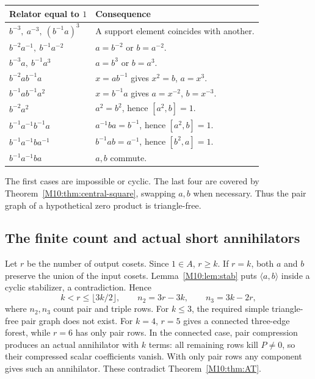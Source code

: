 \documentclass[11pt,a4paper,oneside]{report}
\theoremstyle{definition}
\theoremstyle{remark}
\begin{document}
\begin{center}\small
\begin{tabular}{@{}ll@{}}
\toprule
Relator equal to $1$ & Consequence \\
\midrule
$b^{-3},\ a^{-3},\ (b^{-1}a)^3$
 & A support element coincides with another.\\
$b^{-2}a^{-1},\ b^{-1}a^{-2}$ & $a=b^{-2}$ or $b=a^{-2}$.\\
$b^{-3}a,\ b^{-1}a^3$ & $a=b^3$ or $b=a^3$.\\
$b^{-2}ab^{-1}a$ & $x=ab^{-1}$ gives $x^2=b$, $a=x^3$.\\
$b^{-1}ab^{-1}a^2$ & $x=b^{-1}a$ gives $a=x^{-2}$, $b=x^{-3}$.\\
$b^{-2}a^2$ & $a^2=b^2$, hence $[a^2,b]=1$.\\
$b^{-1}a^{-1}b^{-1}a$ & $a^{-1}ba=b^{-1}$, hence $[a^2,b]=1$.\\
$b^{-1}a^{-1}ba^{-1}$ & $b^{-1}ab=a^{-1}$, hence $[b^2,a]=1$.\\
$b^{-1}a^{-1}ba$ & $a,b$ commute.\\
\bottomrule
\end{tabular}
\end{center}
The first cases are impossible or cyclic. The last four are covered
by Theorem~\ref{M10:thm:central-square}, swapping $a,b$ when necessary.
Thus the pair graph of a hypothetical zero product is triangle-free.

\subsection{The finite count and actual short annihilators}
Let $r$ be the number of output cosets. Since $1\in A$, $r\ge k$.
If $r=k$, both $a$ and $b$ preserve the union of the input cosets.
Lemma~\ref{M10:lem:stab} puts $\langle a,b\rangle$ inside a cyclic
stabilizer, a contradiction. Hence
\[
k<r\le\lfloor3k/2\rfloor,\qquad
n_2=3r-3k,\qquad n_3=3k-2r,
\]
where $n_2,n_3$ count pair and triple rows.
For $k\le3$, the required simple triangle-free pair graph does not
exist. For $k=4$, $r=5$ gives a connected three-edge forest, while
$r=6$ has only pair rows. In the connected case, pair compression
produces an actual annihilator with $k$ terms: all remaining rows
kill $P\ne0$, so their compressed scalar coefficients vanish.
With only pair rows any component gives such an annihilator.
These contradict Theorem~\ref{M10:thm:AT}.
\end{document}

